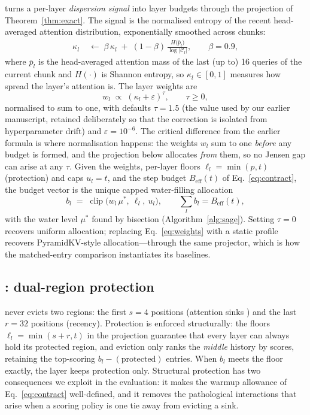 \laba{} turns a per-layer \emph{dispersion signal} into layer budgets
through the projection of Theorem~\ref{thm:exact}. The signal is the
normalised entropy of the recent head-averaged attention distribution,
exponentially smoothed across chunks:
\begin{align}
\kappa_l &\;\leftarrow\; \beta\,\kappa_l \;+\; (1-\beta)\,
\frac{H\!\bigl(\bar p_l\bigr)}{\log \lvert\mathcal{C}_l\rvert},
\qquad \beta = 0.9,
\end{align}
where $\bar p_l$ is the head-averaged attention mass of the last (up to)
16 queries of the current chunk and $H(\cdot)$ is Shannon entropy, so
$\kappa_l\in[0,1]$ measures how spread the layer's attention is. The
layer weights are
\begin{equation}\label{eq:weights}
w_l \;\propto\; (\kappa_l + \varepsilon)^{\tau}, \qquad \tau\ge 0,
\end{equation}
normalised to sum to one, with defaults $\tau=1.5$ (the value used by our
earlier manuscript, retained deliberately so that the correction is
isolated from hyperparameter drift) and $\varepsilon=10^{-6}$. The
critical difference from the earlier formula is where normalisation
happens: the weights $w_l$ sum to one \emph{before} any budget is formed,
and the projection below allocates \emph{from} them, so no Jensen gap can
arise at any $\tau$. Given the weights, per-layer floors
$\ell_l=\min(p,t)$ (protection) and caps $u_l=t$, and the step budget
$B_{\mathrm{eff}}(t)$ of Eq.~\eqref{eq:contract}, the budget vector is
the unique capped water-filling allocation
\begin{equation}\label{eq:waterfill}
b_l \;=\; \operatorname{clip}\!\bigl(w_l\,\mu^{*},\ \ell_l,\ u_l\bigr),
\qquad \sum_l b_l = B_{\mathrm{eff}}(t),
\end{equation}
with the water level $\mu^{*}$ found by bisection
(Algorithm~\ref{alg:sage}). Setting $\tau=0$ recovers uniform allocation;
replacing Eq.~\eqref{eq:weights} with a static profile recovers
PyramidKV-style allocation---through the same projector, which is how the
matched-entry comparison instantiates its baselines.

\subsection{\dre: dual-region protection}

\dre{} never evicts two regions: the first $s=4$ positions (attention
sinks \cite{xiao2024streamingllm}) and the last $r=32$ positions
(recency). Protection is enforced structurally: the floors
$\ell_l=\min(s+r,t)$ in the projection guarantee that every layer can
always hold its protected region, and eviction only ranks the
\emph{middle} history by \acs{} scores, retaining the top-scoring
$b_l - (\text{protected})$ entries. When $b_l$ meets the floor exactly,
the layer keeps protection only. Structural protection has two
consequences we exploit in the evaluation: it makes the warmup allowance
of Eq.~\eqref{eq:contract} well-defined, and it removes the pathological
interactions that arise when a scoring policy is one tie away from
evicting a sink.


